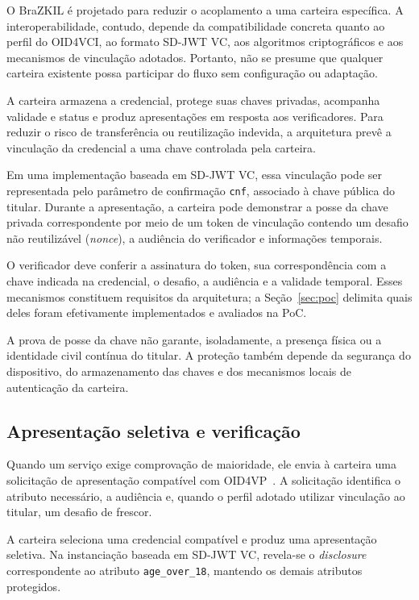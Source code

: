 \documentclass[12pt]{article}
\begin{document}
O BraZKIL é projetado para reduzir o acoplamento a uma carteira específica.
A interoperabilidade, contudo, depende da compatibilidade concreta quanto
ao perfil do OID4VCI, ao formato SD-JWT VC, aos algoritmos criptográficos e
aos mecanismos de vinculação adotados. Portanto, não se presume que
qualquer carteira existente possa participar do fluxo sem configuração ou
adaptação.

A carteira armazena a credencial, protege suas chaves privadas, acompanha
validade e status e produz apresentações em resposta aos verificadores.
Para reduzir o risco de transferência ou reutilização indevida, a
arquitetura prevê a vinculação da credencial a uma chave controlada pela
carteira.

Em uma implementação baseada em SD-JWT VC, essa vinculação pode ser
representada pelo parâmetro de confirmação \texttt{cnf}, associado à chave
pública do titular. Durante a apresentação, a carteira pode demonstrar a
posse da chave privada correspondente por meio de um token de vinculação
contendo um desafio não reutilizável (\textit{nonce}), a audiência do
verificador e informações temporais.

O verificador deve conferir a assinatura do token, sua correspondência com
a chave indicada na credencial, o desafio, a audiência e a validade
temporal. Esses mecanismos constituem requisitos da arquitetura; a
Seção~\ref{sec:poc} delimita quais deles foram efetivamente implementados e
avaliados na PoC.

A prova de posse da chave não garante, isoladamente, a presença física ou a
identidade civil contínua do titular. A proteção também depende da
segurança do dispositivo, do armazenamento das chaves e dos mecanismos
locais de autenticação da carteira.

\subsection{Apresentação seletiva e verificação}
\label{sec:apresentacao-verificacao}

Quando um serviço exige comprovação de maioridade, ele envia à carteira uma solicitação de apresentação compatível com OID4VP~\cite{openid4vp2023}. A solicitação identifica o atributo necessário, a audiência e, quando o perfil adotado utilizar vinculação ao titular, um desafio de frescor.

A carteira seleciona uma credencial compatível e produz uma apresentação seletiva. Na instanciação baseada em SD-JWT VC, revela-se o \textit{disclosure} correspondente ao atributo \texttt{age\_over\_18}, mantendo os demais atributos protegidos.
\end{document}
